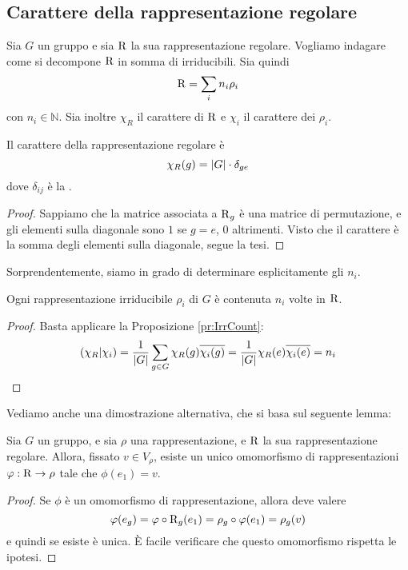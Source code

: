 \subsection{Carattere della rappresentazione regolare}
Sia $G$ un gruppo e sia $\operatorname{R}$ la sua rappresentazione regolare. Vogliamo indagare come si decompone $\operatorname{R}$ in somma di irriducibili. Sia quindi
\[
  \operatorname{R} = \sum_i n_i \rho_i
\]
con $n_i \in \mathbb N$. Sia inoltre $\chi_R$ il carattere di $\operatorname{R}$ e $\chi_i$ il carattere dei $\rho_i$.
  
\begin{myprop}
  Il carattere della rappresentazione regolare è
  \[
  \chi_R(g) = \left|G\right| \cdot \delta_{ge}
  \]
  dove $\delta_{ij}$ è la .
\end{myprop}

\begin{proof}
  Sappiamo che la matrice associata a $\operatorname{R}_g$ è una matrice di permutazione, e gli elementi sulla diagonale sono $1$ se $g=e$, $0$ altrimenti. Visto che il carattere è la somma degli elementi sulla diagonale, segue la tesi.
\end{proof}



Sorprendentemente, siamo in grado di determinare esplicitamente gli $n_i$.
\begin{myprop}
  Ogni rappresentazione irriducibile $\rho_i$ di $G$ è contenuta $n_i$ volte in $\operatorname{R}$.
\end{myprop}

\begin{proof}
  Basta applicare la Proposizione \ref{pr:IrrCount}:
  \[
  \left(\chi_R | \chi_i\right) = \frac1{\left|G\right|}\sum_{g\in G} \chi_R(g)\overline{\chi_i(g)} = \frac1{\left|G\right|}\chi_R(e)\overline{\chi_i(e)} = n_i
  \]

\end{proof}

Vediamo anche una dimostrazione alternativa, che si basa sul seguente lemma:
\begin{mylemma}
  Sia $G$ un gruppo, e sia $\rho$ una rappresentazione, e $\operatorname{R}$ la sua rappresentazione regolare. Allora, fissato $v\in V_\rho$, esiste un unico omomorfismo di rappresentazioni $\varphi: \operatorname{R} \rightarrow \rho$ tale che $\phi(e_1)=v$.
\end{mylemma}
\begin{proof}
  Se $\phi$ è un omomorfismo di rappresentazione, allora deve valere 
  \[
  \varphi(e_g)=\varphi \circ \operatorname{R}_g (e_1) = \rho_g \circ \varphi (e_1) = \rho_g(v)
  \]
  e quindi se esiste è unica. \`E facile verificare che questo omomorfismo rispetta le ipotesi.
\end{proof}

